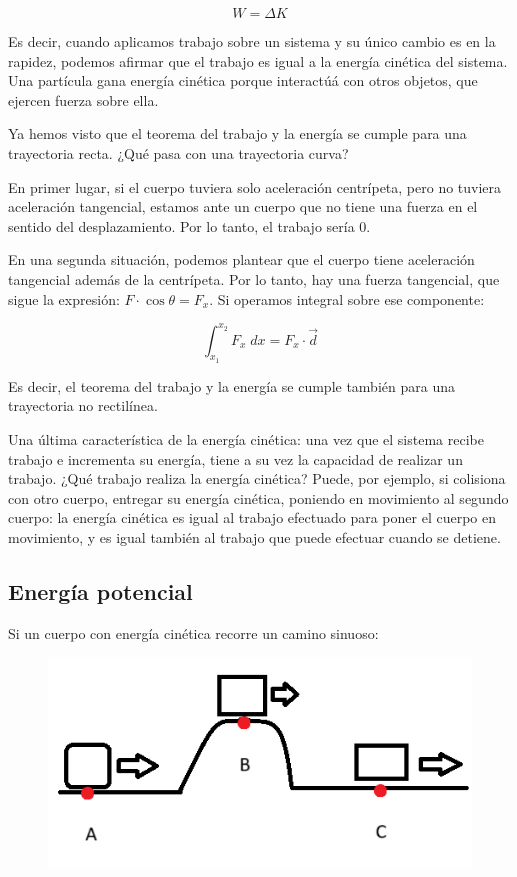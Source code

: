 \begin{equation*}
    W = \Delta K
\end{equation*}

Es decir,
cuando aplicamos trabajo sobre un sistema y su único cambio es en la rapidez,
podemos afirmar que el trabajo es igual a la energía cinética del sistema.
Una partícula gana energía cinética porque interactúá con otros objetos,
que ejercen fuerza sobre ella.

Ya hemos visto que el teorema del trabajo y la energía se cumple para una 
trayectoria recta. ¿Qué pasa con una trayectoria curva?

En primer lugar, si el cuerpo tuviera solo aceleración centrípeta,
pero no tuviera aceleración tangencial,
estamos ante un cuerpo que no tiene una fuerza en el sentido del desplazamiento.
Por lo tanto, el trabajo sería 0.

En una segunda situación, podemos plantear que el cuerpo tiene aceleración 
tangencial además de la centrípeta. Por lo tanto, hay una fuerza tangencial,
que sigue la expresión: \(F\cdot\cos\theta = F_x\).
Si operamos integral sobre ese componente:

\begin{equation*}
    \int_{x_1}^{x_2} F_x \; dx = F_x \cdot \vec{d}
\end{equation*}

Es decir, el teorema del trabajo y la energía se cumple también para una 
trayectoria no rectilínea.

Una última característica de la energía cinética:
una vez que el sistema recibe trabajo e incrementa su energía,
tiene a su vez la capacidad de realizar un trabajo.
¿Qué trabajo realiza la energía cinética?
Puede, por ejemplo, si colisiona con otro cuerpo, entregar su energía cinética,
poniendo en movimiento al segundo cuerpo:
la energía cinética es igual al trabajo efectuado para poner el cuerpo 
en movimiento,
y es igual también al trabajo que puede efectuar cuando se detiene.

\subsection{Energía potencial}

Si un cuerpo con energía cinética recorre un camino sinuoso:

\begin{figure}[H]
    \centering
    \includegraphics[width=.7\textwidth]{img/04-energia-potencial.png}
\end{figure}

